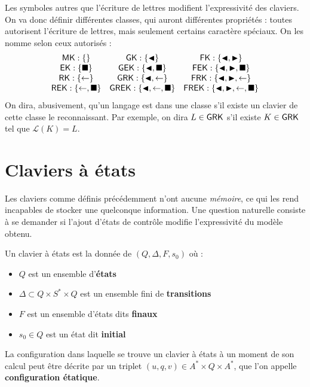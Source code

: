\documentclass[12pt, a4paper]{article}
\renewcommand{\L}{\mathcal{L}}
\begin{document}
    Les symboles autres que l'écriture de lettres modifient l'expressivité des claviers. On va donc définir différentes classes, qui auront différentes propriétés : toutes autorisent l'écriture de lettres, mais seulement certains caractère spéciaux. On les nomme selon ceux autorisés :
    \[
    \begin{array}{ccc}
        \mathsf{MK} : \{\} & \mathsf{GK} : \{\mathord{\blacktriangleleft}\} & \mathsf{FK} :\{\mathord{\blacktriangleleft},\mathord{\blacktriangleright}\} \\
        \mathsf{EK} : \{\mathord{\blacksquare}\} & \mathsf{GEK} : \{\mathord{\blacktriangleleft},\mathord{\blacksquare}\} & \mathsf{FEK} :\{\mathord{\blacktriangleleft},\mathord{\blacktriangleright},\mathord{\blacksquare}\} \\
        \mathsf{RK} : \{\mathord{\leftarrow}\} & \mathsf{GRK} : \{\mathord{\blacktriangleleft},\mathord{\leftarrow}\} & \mathsf{FRK} :\{\mathord{\blacktriangleleft},\mathord{\blacktriangleright},\mathord{\leftarrow}\} \\
        \mathsf{REK} : \{\mathord{\leftarrow}, \mathord{\blacksquare}\} & \mathsf{GREK} : \{\mathord{\blacktriangleleft},\mathord{\leftarrow},\mathord{\blacksquare}\} & \mathsf{FREK} :\{\mathord{\blacktriangleleft},\mathord{\blacktriangleright},\mathord{\leftarrow},\mathord{\blacksquare}\} \\
    \end{array}
    \]
    On dira, abusivement, qu'un langage est dans une classe s'il existe un clavier de cette classe le reconnaissant. Par exemple, on dira $L \in \mathsf{GRK}$ s'il existe $K \in \mathsf{GRK}$ tel que $\L(K) = L$.
    \clearpage


	\section{Claviers à états}
    Les claviers comme définis précédemment n'ont aucune \emph{mémoire}, ce qui les rend incapables de stocker une quelconque information.
    Une question naturelle consiste à se demander si l’ajout d’états de contrôle modifie l’expressivité du modèle obtenu.
    \begin{defétats}
        Un clavier à états est la donnée de $(Q,\Delta ,F,s_0)$ où :
        \begin{itemize}
            \item $Q$ est un ensemble d'\textbf{états}
            \item $\Delta \subset Q \times S^* \times Q$ est un ensemble fini de \textbf{transitions}
            \item $F$ est un ensemble d'états dits \textbf{finaux}
            \item $s_0 \in Q$ est un état dit \textbf{initial}
        \end{itemize}
    \end{defétats}
    \begin{configétats}
        La configuration dans laquelle se trouve un clavier à états à un moment de son calcul peut être décrite par un triplet $(u,q,v) \in A^* \times Q \times A^*$, que l'on appelle \textbf{configuration étatique}.
    \end{configétats}
    
\end{document}

